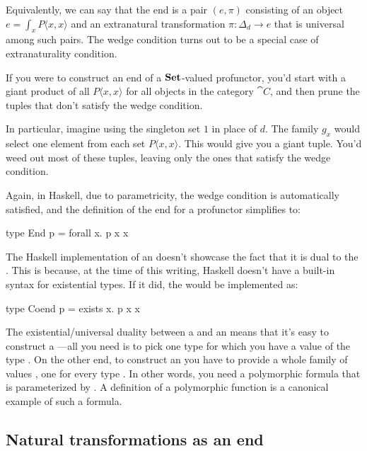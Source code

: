\documentclass[DaoFP]{subfiles}
\begin{document}
Equivalently, we can say that the end is a pair $(e, \pi)$ consisting of an object $e = \int_x P\langle x, x\rangle$ and an  extranatural transformation $\pi \colon \Delta_d \to e$ that is universal among such pairs. The wedge condition turns out to be a special case of extranaturality condition.

If you were to construct an end of a $\mathbf{Set}$-valued profunctor, you'd start with a giant product of all $P \langle x, x \rangle$ for all objects in the category $\cat C$, and then prune the tuples that don't satisfy the wedge condition. 

In particular, imagine using the singleton set $1$ in place of $d$. The family $g_x$ would select one element from each set $P \langle x, x \rangle$. This would give you a giant tuple. You'd weed out most of these tuples, leaving only the ones that satisfy the wedge condition. 

Again, in Haskell, due to parametricity, the wedge condition is automatically satisfied, and the definition of the end for a profunctor  simplifies to:

\begin{haskell}
type End p = forall x. p x x
\end{haskell}

The Haskell implementation of an  doesn't showcase the fact that it is dual to the . This is because, at the time of this writing, Haskell doesn't have a built-in syntax for existential types. If it did, the  would be implemented as:
\begin{haskell}
type Coend p = exists x. p x x
\end{haskell}

The existential/universal duality between a  and an  means that it's easy to construct a ---all you need is to pick one type  for which you have a value of the type . On the other end, to construct an  you have to provide a whole family of values , one for every type . In other words, you need a polymorphic formula that is parameterized by . A definition of a polymorphic function is a canonical example of such a formula.


\subsection{Natural transformations as an end}
\end{document}
